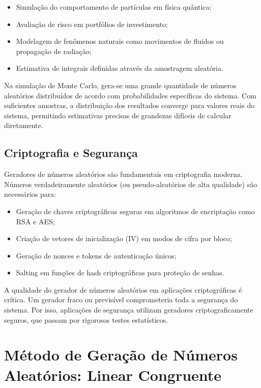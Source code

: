 \documentclass[12pt,a4paper]{article}
\begin{document}
\begin{itemize}
    \item Simulação do comportamento de partículas em física quântica;
    \item Avaliação de risco em portfólios de investimento;
    \item Modelagem de fenômenos naturais como movimentos de fluidos ou propagação de radiação;
    \item Estimativa de integrais definidas através da amostragem aleatória.
\end{itemize}

Na simulação de Monte Carlo, gera-se uma grande quantidade de números aleatórios distribuídos de acordo com probabilidades específicas do sistema. Com suficientes amostras, a distribuição dos resultados converge para valores reais do sistema, permitindo estimativas precisas de grandezas difíceis de calcular diretamente.

\subsection{Criptografia e Segurança}

Geradores de números aleatórios são fundamentais em criptografia moderna. Números verdadeiramente aleatórios (ou pseudo-aleatórios de alta qualidade) são necessários para:

\begin{itemize}
    \item Geração de chaves criptográficas seguras em algoritmos de encriptação como RSA e AES;
    \item Criação de vetores de inicialização (IV) em modos de cifra por bloco;
    \item Geração de nonces e tokens de autenticação únicos;
    \item Salting em funções de hash criptográficas para proteção de senhas.
\end{itemize}

A qualidade do gerador de números aleatórios em aplicações criptográficas é crítica. Um gerador fraco ou previsível comprometeria toda a segurança do sistema. Por isso, aplicações de segurança utilizam geradores criptograficamente seguros, que passam por rigorosos testes estatísticos.

\newpage

\section{Método de Geração de Números Aleatórios: Linear Congruente}
\end{document}
